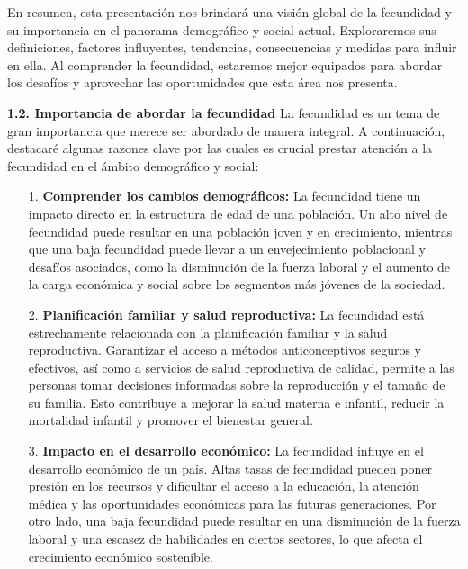 \documentclass[8pt,a4paper]{beamer}
\begin{document}
{\begin{frame}{}
\begin{block}{}
En resumen, esta presentación nos brindará una visión global de la fecundidad y su importancia en el panorama demográfico y social actual. Exploraremos sus definiciones, factores influyentes, tendencias, consecuencias y medidas para influir en ella. Al comprender la fecundidad, estaremos mejor equipados para abordar los desafíos y aprovechar las oportunidades que esta área nos presenta.
\end{block}
\end{frame}

\begin{frame}{}
\begin{block}{\textbf{1.2. Importancia de abordar la fecundidad}}
\setlength{\parskip}{3px}
\justifying
La fecundidad es un tema de gran importancia que merece ser abordado de manera integral. A continuación, destacaré algunas razones clave por las cuales es crucial prestar atención a la fecundidad en el ámbito demográfico y social:
\begin{enumerate}
\setlength{\parskip}{3px}
\justifying
\item[1.] \textbf{Comprender los cambios demográficos:} La fecundidad tiene un impacto directo en la estructura de edad de una población. Un alto nivel de fecundidad puede resultar en una población joven y en crecimiento, mientras que una baja fecundidad puede llevar a un envejecimiento poblacional y desafíos asociados, como la disminución de la fuerza laboral y el aumento de la carga económica y social sobre los segmentos más jóvenes de la sociedad.

\item[2.] \textbf{Planificación familiar y salud reproductiva:} La fecundidad está estrechamente relacionada con la planificación familiar y la salud reproductiva. Garantizar el acceso a métodos anticonceptivos seguros y efectivos, así como a servicios de salud reproductiva de calidad, permite a las personas tomar decisiones informadas sobre la reproducción y el tamaño de su familia. Esto contribuye a mejorar la salud materna e infantil, reducir la mortalidad infantil y promover el bienestar general.

\end{enumerate}
\end{block}
\end{frame}

\begin{frame}{}
\begin{block}{}
\setlength{\parskip}{3px}
\justifying

\begin{enumerate}
\setlength{\parskip}{3px}
\justifying
\item[3.] \textbf{Impacto en el desarrollo económico:} La fecundidad influye en el desarrollo económico de un país. Altas tasas de fecundidad pueden poner presión en los recursos y dificultar el acceso a la educación, la atención médica y las oportunidades económicas para las futuras generaciones. Por otro lado, una baja fecundidad puede resultar en una disminución de la fuerza laboral y una escasez de habilidades en ciertos sectores, lo que afecta el crecimiento económico sostenible.


\end{enumerate}
\end{block}
\end{frame}}
\end{document}
